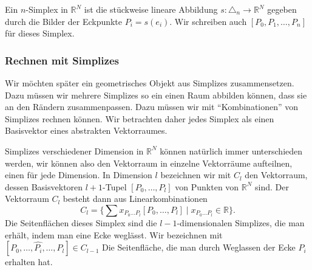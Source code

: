 %


\begin{definition}
Ein $n$-Simplex in $\mathbb{R}^N$ ist die stückweise lineare Abbildung
$s\colon \triangle_n\to \mathbb{R}^N$ gegeben durch die Bilder der Eckpunkte
$P_i = s(e_i)$.
Wir schreiben auch $[P_0,P_1,\dots,P_n]$ für dieses Simplex.
\end{definition}

\subsubsection{Rechnen mit Simplizes}
Wir möchten später ein geometrisches Objekt aus Simplizes zusammensetzen.
Dazu müssen wir mehrere Simplizes so ein einen Raum abbilden können, dass
sie an den Rändern zusammenpassen.
Dazu müssen wir mit ``Kombinationen'' von Simplizes rechnen können.
Wir betrachten daher
jedes Simplex als einen Basisvektor eines abstrakten Vektorraumes.

Simplizes verschiedener Dimension in $\mathbb{R}^N$ können natürlich 
immer unterschieden werden, wir können also den Vektorraum in einzelne
Vektorräume aufteilnen, einen für jede Dimension.
In Dimension $l$ bezeichnen wir mit $C_l$ den Vektorraum, dessen
Basisvektoren $l+1$-Tupel
\(
[P_0,\dots,P_l]
\)
von Punkten von $\mathbb{R}^N$ sind.
Der Vektorraum $C_l$ besteht dann aus Linearkombinationen
\[
C_l
=
\biggl\{
\sum x_{P_0\dots P_l} [P_0,\dots,P_l]
\;\bigg|\;
x_{P_0\dots P_l}\in\mathbb{R}
\biggr\}.
\]
Die Seitenflächen dieses Simplex sind die $l-1$-dimensionalen
Simplizes, die man erhält, indem man eine Ecke weglässt.
Wir bezeichnen mit $[P_0,\dots,\widehat{P_i},\dots,P_l] \in C_{l-1}$
Die Seitenfläche, die man durch Weglassen der Ecke $P_i$
erhalten hat.

